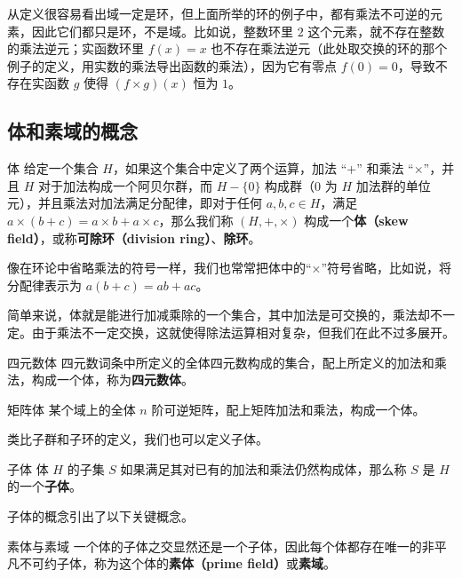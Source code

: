 从定义很容易看出域一定是环，但上面所举的环的例子中，都有乘法不可逆的元素，因此它们都只是环，不是域。比如说，整数环里 $2$ 这个元素，就不存在整数的乘法逆元；实函数环里 $f(x)=x$ 也不存在乘法逆元（此处取交换的环的那个例子的定义，用实数的乘法导出函数的乘法），因为它有零点 $f(0)=0$，导致不存在实函数 $g$ 使得 $(f\times g)(x)$ 恒为 $1$。




\subsection{体和素域的概念}

\begin{definition}{体}\label{def_field_1}
给定一个集合 $H$，如果这个集合中定义了两个运算，加法 “+” 和乘法 “$\times$”，并且 $H$ 对于加法构成一个阿贝尔群，而 $H-\{0\}$ 构成群（$0$ 为 $H$ 加法群的单位元），并且乘法对加法满足分配律，即对于任何 $a, b, c\in H$，满足 $a\times(b+c)=a\times b+a\times c$，那么我们称 $(H, +, \times)$ 构成一个\textbf{体（skew field）}，或称\textbf{可除环（division ring）}、\textbf{除环}。
\end{definition}

像在环论中省略乘法的符号一样，我们也常常把体中的“$\times$”符号省略，比如说，将分配律表示为 $a(b+c)=ab+ac$。

简单来说，体就是能进行加减乘除的一个集合，其中加法是可交换的，乘法却不一定。由于乘法不一定交换，这就使得除法运算相对复杂，但我们在此不过多展开。

\begin{example}{四元数体}
四元数词条中所定义的全体四元数构成的集合，配上所定义的加法和乘法，构成一个体，称为\textbf{四元数体}。
\end{example}

\begin{example}{矩阵体}
某个域上的全体 $n$ 阶可逆矩阵，配上矩阵加法和乘法，构成一个体。
\end{example}

类比子群和子环的定义，我们也可以定义子体。

\begin{definition}{子体}
体 $H$ 的子集 $S$ 如果满足其对已有的加法和乘法仍然构成体，那么称 $S$ 是 $H$ 的一个\textbf{子体}。
\end{definition}
子体的概念引出了以下关键概念。
\begin{definition}{素体与素域}
一个体的子体之交显然还是一个子体，因此每个体都存在唯一的非平凡不可约子体，称为这个体的\textbf{素体（prime field）}或\textbf{素域}。
\end{definition}

